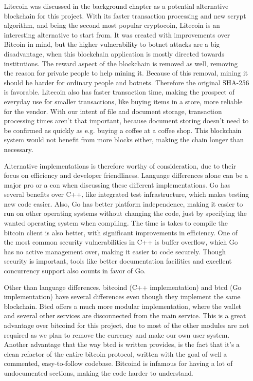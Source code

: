 \documentclass[12pt]{article}
\begin{document}
Litecoin was discussed in the background chapter as a potential alternative blockchain for this project. With its faster transaction processing and new scrypt algorithm, and being the second most popular cryptocoin, Litecoin is an interesting alternative to start from. It was created with improvements over Bitcoin in mind, but the higher vulnerability to botnet attacks are a big disadvantage, when this blockchain application is mostly directed towards institutions. The reward aspect of the blockchain is removed as well, removing the reason for private people to help mining it. Because of this removal, mining it should be harder for ordinary people and botnets. Therefore the original SHA-256 is favorable. Litecoin also has faster transaction time, making the prospect of everyday use for smaller transactions, like buying items in a store, more reliable for the vendor. With our intent of file and document storage, transaction processing times aren't that important, because document storing doesn't need to be confirmed as quickly as e.g. buying a coffee at a coffee shop. This blockchain system would not benefit from more blocks either, making the chain longer than necessary. 

Alternative implementations is therefore worthy of consideration, due to their focus on efficiency and developer friendliness. Language differences alone can be a major pro or a con when discussing these different implementations. Go has several benefits over C++, like integrated test infrastructure, which makes testing new code easier. Also, Go has better platform independence, making it easier to run on other operating systems without changing the code, just by specifying the wanted operating system when compiling. The time is takes to compile the bitcoin client is also better, with significant improvements in efficiency. One of the most common security vulnerabilities in C++ is buffer overflow, which Go has no active management over, making it easier to code securely. Though security is important, tools like better documentation facilities and excellent concurrency support also counts in favor of Go. 

Other than language differences, bitcoind (C++ implementation) and btcd (Go implementation)
have several differences even though they implement the same blockchain. Btcd offers a much more modular implementation, where the wallet and several other services are disconnected from the main service. This is a great advantage over bitcoind for this project, due to most of the other modules are not required as we plan to remove the currency and make our own user system. Another advantage that the way btcd is written provides, is the fact that it's a clean refactor of the entire bitcoin protocol, written with the goal of well a commented, easy-to-follow codebase. Bitcoind is infamous for having a lot of undocumented sections, making the code harder to understand. 
 
\end{document}
